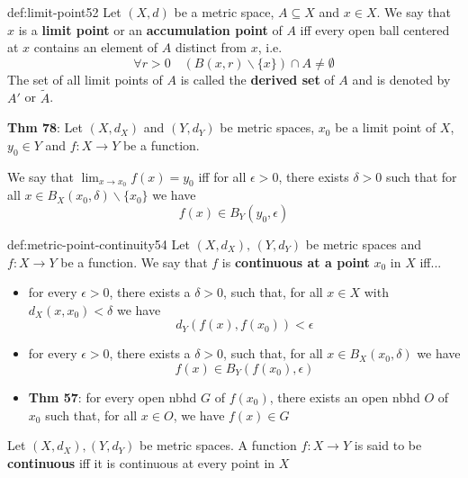 \documentclass[landscape, 8pt]{extarticle}
\begin{document}
\begin{multicols}{3}
\begin{dfn}{def:limit-point}{52}
    Let $(X, d)$ be a metric space, $A \subseteq X$ and $x\in X$. We say that $x$ is a \textbf{limit point} or an \textbf{accumulation point} of $A$ iff every open ball centered at $x$ contains an element of $A$ distinct from $x$, i.e.
    \[\forall r > 0 \quad (B(x,r) \backslash \{x\}) \cap A \ne \emptyset\]
    The set of all limit points of $A$ is called the \textbf{derived set} of $A$ and is denoted by $A'$ or $\tilde{A}$.

    \longrule{0.08ex}
    \textbf{Thm 78}: Let $(X, d_{X})$ and $(Y, d_{Y})$ be metric spaces, $x_{0}$ be a limit point of $X$, $y_{0}\in Y$ and $f : X \to Y$ be a function.

    We say that $\lim_{x\to x_{0}} f(x) = y_{0}$ iff for all $\epsilon > 0$, there exists $\delta > 0$ such that for all $x\in B_{X}(x_{0}, \delta) \backslash \{x_{0}\}$ we have
    \[f(x)\in B_{Y}(y_{0}, \epsilon)\]
\end{dfn}

\vspace{-5pt}
\begin{dfn}{def:metric-point-continuity}{54}
    \vspace{-5pt}
    Let $(X, d_{X}),\, (Y,d_{Y})$ be metric spaces and $f: X \to Y $ be a function. We say that $f$ is \textbf{continuous at a point} $x_{0}$ in $X$ iff...
    \vspace{-8pt}

    \begin{itemize}[leftmargin=*]
        \item for every $\epsilon > 0$, there exists a $\delta > 0$, such that, for all $x\in X$ with $d_{X}(x,x_{0}) < \delta$ we have 
            \[d_{Y}(f(x), f(x_{0})) < \epsilon\]
        \item for every $\epsilon > 0$, there exists a $\delta > 0$, such that, for all $x\in B_{X}(x_{0}, \delta)$ we have 
            \[f(x)\in B_{Y}(f(x_{0}), \epsilon)\]
        \item \textbf{Thm 57}: for every open nbhd $G$ of $f(x_{0})$, there exists an open nbhd $O$ of $x_{0}$ such that, for all $x\in O$, we have $f(x) \in G$

    \end{itemize}

    \vspace{-5pt}

    Let $(X, d_{X}), (Y, d_{Y})$ be metric spaces. A function $f: X \to Y $ is said to be \textbf{continuous} iff it is continuous at every point in $X$
\end{dfn}


\end{multicols}
\end{document}
